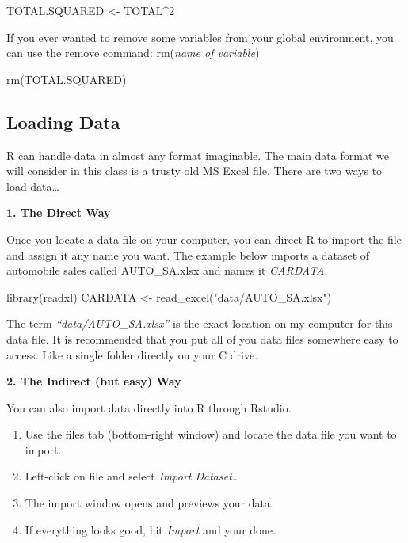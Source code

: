 \documentclass[
]{book}
\newenvironment{Shaded}{\begin{snugshade}}{\end{snugshade}}
\newcommand{\DecValTok}[1]{\textcolor[rgb]{0.00,0.00,0.81}{#1}}
\newcommand{\FunctionTok}[1]{\textcolor[rgb]{0.00,0.00,0.00}{#1}}
\newcommand{\NormalTok}[1]{#1}
\newcommand{\OtherTok}[1]{\textcolor[rgb]{0.56,0.35,0.01}{#1}}
\newcommand{\SpecialCharTok}[1]{\textcolor[rgb]{0.00,0.00,0.00}{#1}}
\newcommand{\StringTok}[1]{\textcolor[rgb]{0.31,0.60,0.02}{#1}}
\begin{document}
\begin{Shaded}
\begin{Highlighting}[]
\NormalTok{TOTAL.SQUARED }\OtherTok{\textless{}{-}}\NormalTok{ TOTAL}\SpecialCharTok{\^{}}\DecValTok{2}
\end{Highlighting}
\end{Shaded}

If you ever wanted to remove some variables from your global environment, you can use the remove command: rm(\emph{name of variable})

\begin{Shaded}
\begin{Highlighting}[]
\FunctionTok{rm}\NormalTok{(TOTAL.SQUARED)}
\end{Highlighting}
\end{Shaded}

\hypertarget{loading-data}{%
\subsection{Loading Data}\label{loading-data}}

R can handle data in almost any format imaginable. The main data format we will consider in this class is a trusty old MS Excel file. There are two ways to load data\ldots{}

\textbf{1. The Direct Way}

Once you locate a data file on your computer, you can direct R to import the file and assign it any name you want. The example below imports a dataset of automobile sales called AUTO\_SA.xlsx and names it \emph{CARDATA}.

\begin{Shaded}
\begin{Highlighting}[]
\FunctionTok{library}\NormalTok{(readxl)}
\NormalTok{CARDATA }\OtherTok{\textless{}{-}} \FunctionTok{read\_excel}\NormalTok{(}\StringTok{"data/AUTO\_SA.xlsx"}\NormalTok{)}
\end{Highlighting}
\end{Shaded}

The term \emph{``data/AUTO\_SA.xlsx''} is the exact location on my computer for this data file. It is recommended that you put all of you data files somewhere easy to access. Like a single folder directly on your C drive.

\textbf{2. The Indirect (but easy) Way}

You can also import data directly into R through Rstudio.

\begin{enumerate}
\def\labelenumi{\arabic{enumi}.}
\item
  Use the files tab (bottom-right window) and locate the data file you want to import.
\item
  Left-click on file and select \emph{Import Dataset\ldots{}}
\item
  The import window opens and previews your data.
\item
  If everything looks good, hit \emph{Import} and your done.
\end{enumerate}
\end{document}

